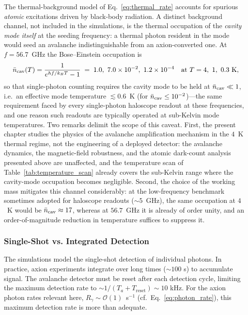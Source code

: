 The thermal-background model of Eq.~\eqref{eq:thermal_rate} accounts for
spurious \emph{atomic} excitations driven by black-body radiation. A distinct
background channel, not included in the simulations, is the thermal
occupation of the \emph{cavity mode itself} at the seeding frequency: a
thermal photon resident in the mode would seed an avalanche indistinguishable
from an axion-converted one. At $f = 56.7$~GHz the Bose--Einstein occupation
is
\begin{equation}
    \bar{n}_{\rm cav}(T) = \frac{1}{e^{hf/k_BT}-1}
    \;=\; 1.0,\ 7.0\times10^{-2},\ 1.2\times10^{-4}
    \quad \text{at } T = 4,\ 1,\ 0.3~\mathrm{K},
\end{equation}
so that single-photon counting requires the cavity mode to be held at
$\bar{n}_{\rm cav} \ll 1$, i.e.\ an effective mode temperature
$\lesssim 0.6$~K (for $\bar{n}_{\rm cav} \leq 10^{-2}$)---the same
requirement faced by every single-photon haloscope readout at these
frequencies, and one reason such readouts are typically operated at
sub-Kelvin mode temperatures. Two remarks delimit the scope of this caveat.
First, the present chapter studies the physics of the avalanche
amplification mechanism in the $4$~K thermal regime, not the engineering of
a deployed detector: the avalanche dynamics, the magnetic-field robustness,
and the atomic dark-count analysis presented above are unaffected, and the
temperature scan of Table~\ref{tab:temperature_scan} already covers the
sub-Kelvin range where the cavity-mode occupation becomes negligible.
Second, the choice of the working mass mitigates this channel considerably:
at the low-frequency benchmark sometimes adopted for haloscope readouts
($\sim 5$~GHz), the same occupation at $4$~K would be
$\bar{n}_{\rm cav} \approx 17$, whereas at $56.7$~GHz it is already of order
unity, and an order-of-magnitude reduction in temperature suffices to
suppress it.

\subsubsection{Single-Shot vs. Integrated Detection}

The simulations model the single-shot detection of individual photons. In practice, axion experiments integrate over long times ($\sim 100$ s) to accumulate signal. The avalanche detector must be reset after each detection cycle, limiting the maximum detection rate to $\sim 1/(T_a + T_{\mathrm{reset}}) \sim 10$ kHz. For the axion photon rates relevant here, $R_\gamma\!\sim\!\mathcal{O}(1)$~s$^{-1}$ (cf.\ Eq.~\ref{eq:photon_rate}), this maximum detection rate is more than adequate.

